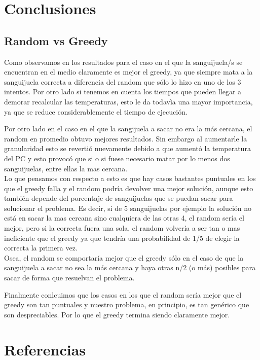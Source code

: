 \section{Conclusiones}

\subsection{Random vs Greedy}

Como observamos en los resultados para el caso en el que la sanguijuela/s se encuentran en el medio claramente es mejor el greedy, ya que siempre mata a la sanguijuela correcta a diferencia del random que sólo lo hizo en uno de los 3 intentos. Por otro lado si tenemos en cuenta los tiempos que pueden llegar a demorar recalcular las temperaturas, esto le da todavìa una mayor importancia, ya que se reduce considerablemente el tiempo de ejecución.

Por otro lado en el caso en el que la sangijuela a sacar no era la más cercana, el random en promedio obtuvo mejores resultados. Sin embargo al aumentarle la granularidad esto se revertió nuevamente debido a que aumentó la temperatura del PC y esto provocó que si o si fuese necesario matar por lo menos dos sanguijuelas, entre ellas la mas cercana. \\
Lo que pensamos con respecto a esto es que hay casos bastantes puntuales en los que el greedy falla y el random podría devolver una mejor solución, aunque esto también depende del porcentaje de sanguijuelas que se puedan sacar para solucionar el problema. Es decir, si de 5 sanguijuelas por ejemplo la solución no está en sacar la mas cercana sino cualquiera de las otras 4, el random sería el mejor, pero si la correcta fuera una sola, el random volvería a ser tan o mas ineficiente que el greedy ya que tendría una probabilidad de 1/5 de elegir la correcta la primera vez.\\
Osea, el random se comportaría mejor que el greedy sólo en el caso de que la sanguijuela a sacar no sea la más cercana y haya otras n/2 (o más) posibles para sacar de forma que resuelvan el problema.

Finalmente conlcuimos que los casos en los que el random sería mejor que el greedy son tan puntuales y nuestro problema, en principio, es tan genérico que son despreciables. Por lo que el greedy termina siendo claramente mejor.

\newpage

\section{Referencias}\label{sec:MatrizCuadrada}

